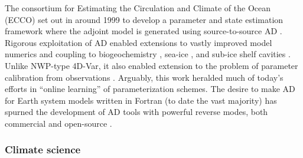 The consortium for Estimating the Circulation and Climate of the Ocean (ECCO) \cite{Stammer.2002} set out in around 1999 to develop a parameter and state estimation framework
where the adjoint model is generated using source-to-source AD \cite{Marotzke:1999, Heimbach.2005}. 
Rigorous exploitation of AD enabled extensions to vastly improved model numerics \cite{Forget.2015m9i} and coupling to biogeochemistry \cite{Dutkiewicz:2006gw}, sea-ice \cite{Heimbach:2010fz}, and sub-ice shelf cavities \cite{Heimbach:2012iu,Goldberg:2020dl}.
Unlike NWP-type 4D-Var, it also enabled extension to the problem of parameter calibration from observations \cite{Ferreira.2005,Stammer:2005dw,Liu:2012jd}. 
Arguably, this work heralded much of today's efforts in ``online learning'' of parameterization schemes.
The desire to make AD for Earth system models written in Fortran (to date the vast majority) has  spurned the development of AD tools with powerful reverse modes, both commercial \cite{Giering:1998in,Giering.2006} and open-source \cite{Utke:2008ko,Hascoet.2013,Gaikwad.2023,Gaikwad.2024}.

\subsubsection{Climate science}

